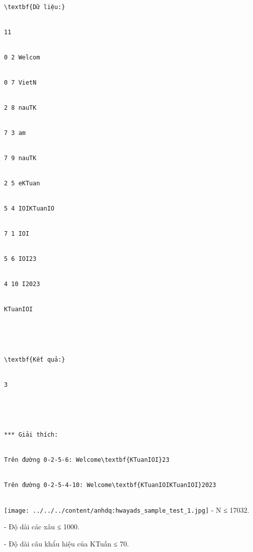 \begin{verbatim}
\textbf{Dữ liệu:}


11


0 2 Welcom


0 7 VietN


2 8 nauTK


7 3 am


7 9 nauTK


2 5 eKTuan


5 4 IOIKTuanIO


7 1 IOI


5 6 IOI23


4 10 I2023


KTuanIOI





\textbf{Kết quả:}


3





*** Giải thích:


Trên đường 0-2-5-6: Welcome\textbf{KTuanIOI}23


Trên đường 0-2-5-4-10: Welcome\textbf{KTuanIOIKTuanIOI}2023


\end{verbatim}


\texttt{[image: ../../../content/anhdq:hwayads\_sample\_test\_1.jpg]}
- N ≤ 17032.   


   - Độ dài các xâu ≤ 1000.   


   - Độ dài câu khẩu hiệu của KTuấn ≤ 70.